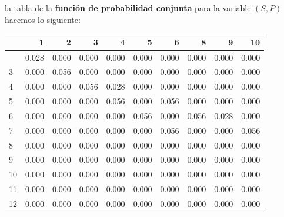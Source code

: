 \documentclass[
  letterpaper,
  DIV=11,
  numbers=noendperiod]{scrreprt}
\newenvironment{Shaded}{\begin{snugshade}}{\end{snugshade}}
\newcommand{\AttributeTok}[1]{\textcolor[rgb]{0.40,0.45,0.13}{#1}}
\newcommand{\DecValTok}[1]{\textcolor[rgb]{0.68,0.00,0.00}{#1}}
\newcommand{\FunctionTok}[1]{\textcolor[rgb]{0.28,0.35,0.67}{#1}}
\newcommand{\NormalTok}[1]{\textcolor[rgb]{0.00,0.23,0.31}{#1}}
\newcommand{\OtherTok}[1]{\textcolor[rgb]{0.00,0.23,0.31}{#1}}
\newcommand{\SpecialCharTok}[1]{\textcolor[rgb]{0.37,0.37,0.37}{#1}}
\begin{document}
la tabla de la \textbf{función de probabilidad conjunta} para la
variable \((S,P)\) hacemos lo siguiente:

\begin{Shaded}
\end{Shaded}

\begin{longtable}[]{@{}lrrrrrrrrr@{}}
\toprule\noalign{}
& 1 & 2 & 3 & 4 & 5 & 6 & 8 & 9 & 10 \\
\midrule\noalign{}
\endhead
\bottomrule\noalign{}
\endlastfoot
2 & 0.028 & 0.000 & 0.000 & 0.000 & 0.000 & 0.000 & 0.000 & 0.000 &
0.000 \\
3 & 0.000 & 0.056 & 0.000 & 0.000 & 0.000 & 0.000 & 0.000 & 0.000 &
0.000 \\
4 & 0.000 & 0.000 & 0.056 & 0.028 & 0.000 & 0.000 & 0.000 & 0.000 &
0.000 \\
5 & 0.000 & 0.000 & 0.000 & 0.056 & 0.000 & 0.056 & 0.000 & 0.000 &
0.000 \\
6 & 0.000 & 0.000 & 0.000 & 0.000 & 0.056 & 0.000 & 0.056 & 0.028 &
0.000 \\
7 & 0.000 & 0.000 & 0.000 & 0.000 & 0.000 & 0.056 & 0.000 & 0.000 &
0.056 \\
8 & 0.000 & 0.000 & 0.000 & 0.000 & 0.000 & 0.000 & 0.000 & 0.000 &
0.000 \\
9 & 0.000 & 0.000 & 0.000 & 0.000 & 0.000 & 0.000 & 0.000 & 0.000 &
0.000 \\
10 & 0.000 & 0.000 & 0.000 & 0.000 & 0.000 & 0.000 & 0.000 & 0.000 &
0.000 \\
11 & 0.000 & 0.000 & 0.000 & 0.000 & 0.000 & 0.000 & 0.000 & 0.000 &
0.000 \\
12 & 0.000 & 0.000 & 0.000 & 0.000 & 0.000 & 0.000 & 0.000 & 0.000 &
0.000 \\
\end{longtable}
\end{document}
